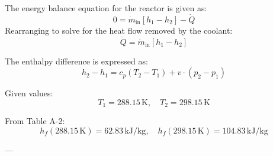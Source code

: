 The energy balance equation for the reactor is given as:  
\[
0 = \dot{m}_{\text{in}} \left[ h_1 - h_2 \right] - \dot{Q}
\]  
Rearranging to solve for the heat flow removed by the coolant:  
\[
\dot{Q} = \dot{m}_{\text{in}} \left[ h_1 - h_2 \right]
\]  

The enthalpy difference is expressed as:  
\[
h_2 - h_1 = c_p \left( T_2 - T_1 \right) + v \cdot \left( p_2 - p_1 \right)
\]  

Given values:  
\[
T_1 = 288.15 \, \text{K}, \quad T_2 = 298.15 \, \text{K}
\]  

From Table A-2:  
\[
h_f(288.15 \, \text{K}) = 62.83 \, \text{kJ/kg}, \quad h_f(298.15 \, \text{K}) = 104.83 \, \text{kJ/kg}
\]  

---